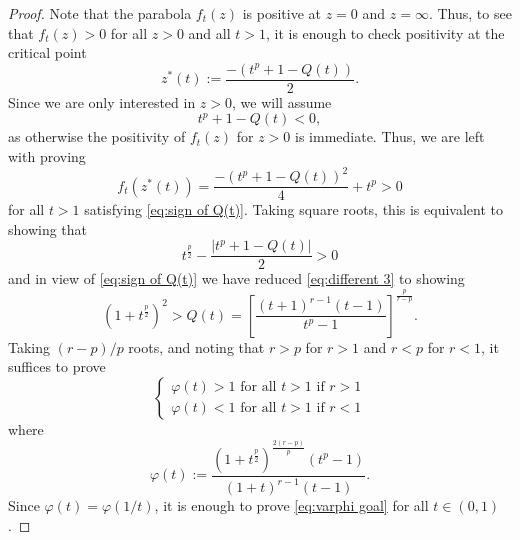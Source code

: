 \documentclass[reqno, 10pt]{amsart}
\theoremstyle{plain}
\numberwithin{equation}{section}
\theoremstyle{definition}
\newtheorem*{induction hypothesis}{Induction hypothesis}
\theoremstyle{remark}
\begin{document}
\begin{proof}
Note that the parabola $f_t(z)$ is positive at $z=0$ and $z=\infty$. Thus, to see that $f_t(z)>0$ for all $z>0$ and all $t>1$, it is enough to check positivity at the critical point  
\[z^*(t) := \frac{-(t^p + 1 - Q(t))}{2}.\]
Since we are only interested in $z>0$, we will assume
\begin{equation}\label{eq:sign of Q(t)}
t^p + 1 - Q(t) < 0,
\end{equation}
as otherwise the positivity of $f_t(z)$ for $z>0$ is immediate. Thus, we are left with proving 
\begin{equation}\label{eq:different 3}
    f_t(z^*(t))=\frac{-(t^p + 1 - Q(t))^2}{4} + t^p > 0
\end{equation}
for all $t>1$ satisfying \eqref{eq:sign of Q(t)}. Taking square roots, this is equivalent to showing that
\begin{equation*}
t^\frac{p}{2} - \frac{ |t^p + 1-Q(t)|}{2} > 0
\end{equation*}
and in view of \eqref{eq:sign of Q(t)} we have reduced \eqref{eq:different 3} to showing 
\begin{equation*}
    (1+t^\frac{p}{2})^2 > Q(t)=\left[ \frac{(t+1)^{r-1} (t-1)}{t^p - 1} \right]^{\frac{p}{r-p}}.
\end{equation*}
Taking $(r-p)/p$ roots, and noting that $r>p$ for $r>1$ and $r < p$ for $r<1$, it suffices to prove
\begin{equation}\label{eq:varphi goal}
    \begin{cases}
        \varphi(t) > 1  \text{ for all $t >1$ if $r >1$} \\
        \varphi(t) < 1 \text{ for all $t>1$ if  $r <1$}
    \end{cases}
\end{equation}
where 
\[\varphi(t) := \frac{(1+t^\frac{p}{2})^{\frac{2(r-p)}{p}} (t^p-1)}{(1+t)^{r-1}(t-1)}.  \]
Since $\varphi(t) = \varphi(1/t)$, it is enough to prove \eqref{eq:varphi goal} for all $t\in (0,1)$. 





\end{proof}
\end{document}
